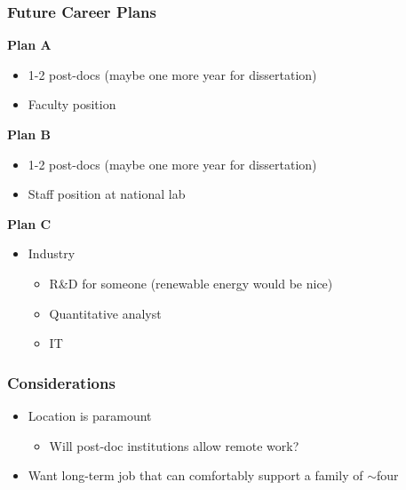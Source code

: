 \documentclass{beamer}
\begin{document}
\begin{frame}
\frametitle{Future Career Plans}

\textbf{Plan A}
\begin{itemize}
  \item 1-2 post-docs (maybe one more year for dissertation)
  \item Faculty position
\end{itemize}

\textbf{Plan B}
\begin{itemize}
  \item 1-2 post-docs (maybe one more year for dissertation)
  \item Staff position at national lab
\end{itemize}

\textbf{Plan C}
\begin{itemize}
  \item Industry
  \begin{itemize}
    \item R\&D for someone (renewable energy would be nice)
    \item Quantitative analyst
    \item IT
  \end{itemize}
\end{itemize}

\end{frame}

\begin{frame}
\frametitle{Considerations}

\begin{itemize}
  \item Location is paramount
        \begin{itemize}
          \item Will post-doc institutions allow remote work?
        \end{itemize}
  \item Want long-term job that can comfortably support a family of $\sim$four
\end{itemize}

\end{frame}
\end{document}
